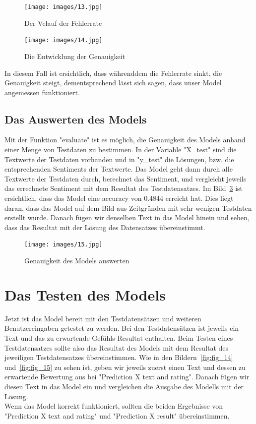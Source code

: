 \begin{figure}[ht!]
\centering
\texttt{[image: images/13.jpg]}
\caption{Der Velauf der Fehlerrate}
\label{fig:fig_11}
\end{figure}
\FloatBarrier

\begin{figure}[ht!]
\centering
\texttt{[image: images/14.jpg]}
\caption{Die Entwicklung der Genauigkeit}
\label{fig:fig_12}
\end{figure}
\FloatBarrier
In diesem Fall ist ersichtlich, dass währenddem die Fehlerrate sinkt, die Genauigkeit steigt, dementsprechend lässt sich sagen, dass unser Model angemessen funktioniert.

\subsection{Das Auswerten des Models}

Mit der Funktion "evaluate" ist es möglich, die Genauigkeit des Models anhand einer Menge von Testdaten zu bestimmen. In der Variable "X\_test" sind die Textwerte der Testdaten vorhanden und in "y\_test" die Lösungen, bzw. die entsprechenden Sentiments der Textwerte. Das Model geht dann durch alle Textwerte der Testdaten durch, berechnet das Sentiment, und vergleicht jeweils das errechnete Sentiment mit dem Resultat des Testdatensatzes.
Im Bild~\ref{fig:fig_13} ist ersichtlich, dass das Model eine accuracy von 0.4844 erreicht hat. Dies liegt daran, dass das Model auf dem Bild aus Zeitgründen mit sehr wenigen Testdaten erstellt wurde. Danach fügen wir denselben Text in das Model hinein und sehen, dass das Resultat mit der Lösung des Datensatzes übereinstimmt.
\begin{figure}[ht!]
\centering
\texttt{[image: images/15.jpg]}
\caption{Genauigkeit des Models auswerten}
\label{fig:fig_13}
\end{figure}
\FloatBarrier

\newpage
\section{Das Testen des Models}

Jetzt ist das Model bereit mit den Testdatensätzen und weiteren Benutzereingaben getestet zu werden. Bei den Testdatensätzen ist jeweils ein Text und das zu erwartende Gefühls-Resultat enthalten. Beim Testen eines Testdatensatzes sollte also das Resultat des Models mit dem Resultat des jeweiligen Testdatensatzes übereinstimmen. Wie in den Bildern~\ref{fig:fig_14} und~\ref{fig:fig_15} zu sehen ist, geben wir jeweils zuerst einen Text und dessen zu erwartende Bewertung aus bei "Prediction X text and rating". Danach fügen wir diesen Text in das Model ein und vergleichen die Ausgabe des Modells mit der Lösung.\\Wenn das Model korrekt funktioniert, sollten die beiden Ergebnisse von "Prediction X text and rating" und "Prediction X result" übereinstimmen.

